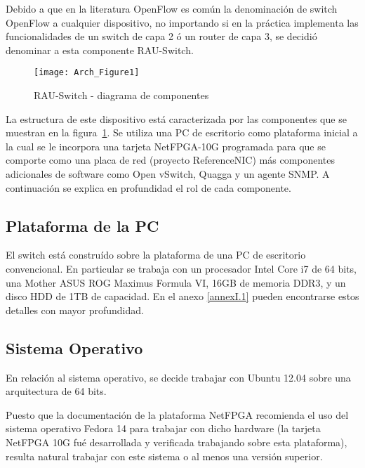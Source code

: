 Debido a que en la literatura OpenFlow es común la denominación de switch OpenFlow a cualquier dispositivo, no importando si en la pr\'actica implementa las funcionalidades de un switch de capa 2 \'o un router de capa 3, se decidió denominar a esta componente RAU-Switch.\\

\begin{figure}[h] 
\centering    
\texttt{[image: Arch\_Figure1]}
\caption[RAU-Switch - diagrama de componentes]{RAU-Switch - diagrama de componentes}
\label{fig:OpenSourceRArch}
\end{figure}

La estructura de este dispositivo est\'a caracterizada por las componentes que se muestran en la figura~\ref{fig:OpenSourceRArch}. Se utiliza una PC de escritorio como plataforma inicial a la cual se le incorpora una tarjeta NetFPGA-10G programada para que se comporte como una placa de red (proyecto ReferenceNIC) m\'as componentes adicionales de software como Open vSwitch, Quagga y un agente SNMP. A continuaci\'on se explica en profundidad el rol de cada componente.

\subsection{Plataforma de la PC}
El switch est\'a constru\'ido sobre la plataforma de una PC de escritorio convencional. En particular se trabaja con un procesador Intel Core i7 de 64 bits, una Mother ASUS ROG Maximus Formula VI, 16GB de memoria DDR3, y un disco HDD de 1TB de capacidad. En el anexo \ref{annexI.1} pueden encontrarse estos detalles con mayor profundidad.

\subsection{Sistema Operativo}
En relación al sistema operativo, se decide trabajar con Ubuntu 12.04 sobre una arquitectura de 64 bits. %

Puesto que la documentaci\'on de la plataforma NetFPGA recomienda el uso del sistema operativo Fedora 14 para trabajar con dicho hardware (la tarjeta NetFPGA 10G fu\'e desarrollada y verificada trabajando sobre esta plataforma), resulta natural trabajar con este sistema o al menos una versi\'on superior. 

